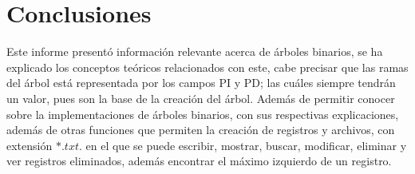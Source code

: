 \documentclass[10pt,conference]{IEEEtran}
\begin{document}
\section{\textbf{Conclusiones}}
Este informe presentó información relevante acerca de árboles binarios, se ha explicado los conceptos teóricos relacionados con este, cabe precisar que las ramas del árbol está representada por los campos PI y PD; las cuáles siempre tendrán un valor, pues son la base de la creación del árbol. Además de permitir conocer sobre la implementaciones de árboles binarios, con sus respectivas explicaciones, además de otras funciones que permiten la creación de registros y archivos, con extensión $*.txt$. en el que se puede escribir, mostrar, buscar, modificar, eliminar y ver registros eliminados, además encontrar el máximo izquierdo de un registro.

\medskip

\end{document}
